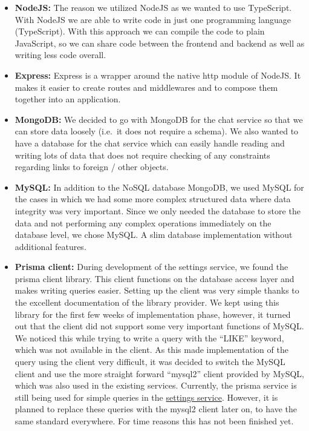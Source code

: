\begin{itemize}
    \item \textbf{NodeJS:} The reason we utilized NodeJS as we wanted to use TypeScript.
        With NodeJS we are able to write code in just one programming language (TypeScript).
        With this approach we can compile the code to plain JavaScript, so we can share code between the frontend and
        backend as well as writing less code overall.
    \item \textbf{Express:} Express is a wrapper around the native \ac{http} module of NodeJS.
        It makes it easier to create routes and middlewares and to compose them together into an application.
    \item \textbf{MongoDB:} We decided to go with MongoDB for the chat service so that we can store data loosely
    (i.e.\ it does not require a schema).
        We also wanted to have a database for the chat service which can easily handle reading and writing lots of data
        that does not require checking of any constraints regarding links to foreign / other objects.
    \item \textbf{MySQL:} In addition to the NoSQL database MongoDB, we used MySQL for the cases in which we had some
        more complex structured data where data integrity was very important.
        Since we only needed the database to store the data and not performing any complex operations immediately on
        the database level, we chose MySQL.
        A slim database implementation without additional features.
    \item \textbf{Prisma client:} During development of the settings service, we found the prisma client library.
    This client functions on the database access layer and makes writing queries easier.
    Setting up the client was very simple thanks to the excellent documentation of the library provider.
    We kept using this library for the first few weeks of implementation phase, however, it turned out that the
    client did not support some very important functions of MySQL.
    We noticed this while trying to write a query with the \enquote{LIKE} keyword, which was not available in the
    client.
    As this made implementation of the query using the client very difficult, it was decided to switch the MySQL
    client and use the more straight forward \enquote{mysql2} client provided by MySQL, which was also used in the
    existing services.
    Currently, the prisma service is still being used for simple queries in the
    \hyperref[subsubsec:settingsSer]{settings service}.
    However, it is planned to replace these queries with the mysql2 client later on, to have the same standard
    everywhere.
    For time reasons this has not been finished yet.
\end{itemize}
